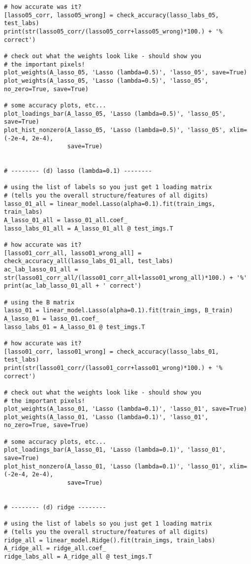 \documentclass[10pt]{article}
\begin{document}
\begin{lstlisting}
# how accurate was it?
[lasso05_corr, lasso05_wrong] = check_accuracy(lasso_labs_05, test_labs)
print(str(lasso05_corr/(lasso05_corr+lasso05_wrong)*100.) + '% correct')

# check out what the weights look like - should show you 
# the important pixels!
plot_weights(A_lasso_05, 'Lasso (lambda=0.5)', 'lasso_05', save=True)
plot_weights(A_lasso_05, 'Lasso (lambda=0.5)', 'lasso_05', no_zero=True, save=True)

# some accuracy plots, etc...
plot_loadings_bar(A_lasso_05, 'Lasso (lambda=0.5)', 'lasso_05', save=True)
plot_hist_nonzero(A_lasso_05, 'Lasso (lambda=0.5)', 'lasso_05', xlim=(-2e-4, 2e-4),
                  save=True)


# -------- (d) lasso (lambda=0.1) --------

# using the list of labels so you just get 1 loading matrix 
# (tells you the overall structure/features of all digits)
lasso_01_all = linear_model.Lasso(alpha=0.1).fit(train_imgs, train_labs)
A_lasso_01_all = lasso_01_all.coef_
lasso_labs_01_all = A_lasso_01_all @ test_imgs.T

# how accurate was it?
[lasso01_corr_all, lasso01_wrong_all] = check_accuracy_all(lasso_labs_01_all, test_labs)
ac_lab_lasso_01_all = str(lasso01_corr_all/(lasso01_corr_all+lasso01_wrong_all)*100.) + '%'
print(ac_lab_lasso_01_all + ' correct')

# using the B matrix
lasso_01 = linear_model.Lasso(alpha=0.1).fit(train_imgs, B_train)
A_lasso_01 = lasso_01.coef_
lasso_labs_01 = A_lasso_01 @ test_imgs.T

# how accurate was it?
[lasso01_corr, lasso01_wrong] = check_accuracy(lasso_labs_01, test_labs)
print(str(lasso01_corr/(lasso01_corr+lasso01_wrong)*100.) + '% correct')

# check out what the weights look like - should show you 
# the important pixels!
plot_weights(A_lasso_01, 'Lasso (lambda=0.1)', 'lasso_01', save=True)
plot_weights(A_lasso_01, 'Lasso (lambda=0.1)', 'lasso_01', no_zero=True, save=True)

# some accuracy plots, etc...
plot_loadings_bar(A_lasso_01, 'Lasso (lambda=0.1)', 'lasso_01', save=True)
plot_hist_nonzero(A_lasso_01, 'Lasso (lambda=0.1)', 'lasso_01', xlim=(-2e-4, 2e-4),
                  save=True)


# -------- (d) ridge --------

# using the list of labels so you just get 1 loading matrix 
# (tells you the overall structure/features of all digits)
ridge_all = linear_model.Ridge().fit(train_imgs, train_labs)
A_ridge_all = ridge_all.coef_
ridge_labs_all = A_ridge_all @ test_imgs.T


\end{lstlisting}
\end{document}
